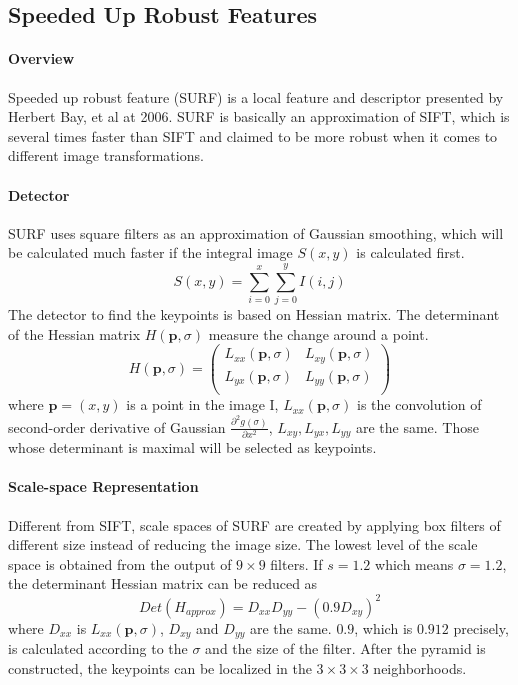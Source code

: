 \documentclass[paper=a4, fontsize=11pt]{scrartcl} %
\numberwithin{equation}{section} %
\numberwithin{figure}{section} %
\numberwithin{table}{section} %
\begin{document}

\subsection{Speeded Up Robust Features}

\paragraph{Overview}
Speeded up robust feature (SURF) is a local feature and descriptor presented by Herbert Bay, et al at 2006. 
SURF is basically an approximation of SIFT, 
which is several times faster than SIFT and claimed to be more robust when it comes to different image transformations.

\paragraph{Detector}
SURF uses square filters as an approximation of Gaussian smoothing, which will be calculated much faster if the integral image $S(x, y)$ is calculated first.
$$
S(x, y) = \sum_{i=0}^x \sum_{j=0}^y I(i, j)
$$
The detector to find the keypoints is based on Hessian matrix. 
The determinant of the Hessian matrix $H(\mathbf{p}, \sigma)$ measure the change around a point. 
$$
H(\mathbf{p}, \sigma) = 
\begin{pmatrix}
L_{xx}(\mathbf{p}, \sigma) & L_{xy}(\mathbf{p}, \sigma) \\ 
L_{yx}(\mathbf{p}, \sigma) & L_{yy}(\mathbf{p}, \sigma) \\ 
\end{pmatrix}
$$
where $\mathbf{p} = (x, y)$ is a point in the image I, 
$L_{xx}(\mathbf{p}, \sigma)$ is the convolution of second-order derivative of Gaussian $ \frac{\partial ^2 g(\sigma)}{\partial x^2} $,
$L_{xy}, L_{yx}, L_{yy}$ are the same.
Those whose determinant is maximal will be selected as keypoints.

\paragraph{Scale-space Representation}
Different from SIFT, scale spaces of SURF are created by applying box filters of different size instead of reducing the image size.
The lowest level of the scale space is obtained from the output of $9 \times 9$ filters. 
If $s = 1.2$ which means $\sigma = 1.2$, the determinant Hessian matrix can be reduced as 
$$
Det(H_{approx}) = D_{xx}D_{yy} - (0.9D_{xy})^2
$$
where $D_{xx}$ is $L_{xx}(\mathbf{p}, \sigma)$, $D_{xy}$ and $D_{yy}$ are the same. 
$0.9$, which is $0.912$ precisely, is calculated according to the $\sigma$ and the size of the filter.
After the pyramid is constructed, the keypoints can be localized in the $3 \times 3 \times 3$ neighborhoods. 
\end{document}
